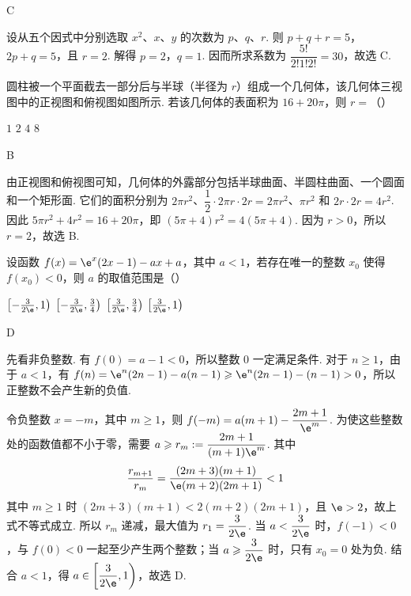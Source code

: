 \begin{answer}
C
\end{answer}

\begin{solution}
设从五个因式中分别选取 \(x^2\)、\(x\)、\(y\) 的次数为 \(p\)、\(q\)、\(r\). 则
\(p+q+r=5\)，\(2p+q=5\)，且 \(r=2\). 解得 \(p=2\)，\(q=1\). 因而所求系数为
\(\dfrac{5!}{2!1!2!}=30\)，故选 C.
\end{solution}

\begin{problem}
圆柱被一个平面截去一部分后与半球（半径为 \(r\)）组成一个几何体，该几何体三视图中的正视图和俯视图如图所示. 若该几何体的表面积为 \(16 + 20\pi\)，则 \(r=\)（\quad）


\choices
    {\(1\)}
    {\(2\)}
    {\(4\)}
    {\(8\)}
\end{problem}

\begin{answer}
B
\end{answer}

\begin{solution}
由正视图和俯视图可知，几何体的外露部分包括半球曲面、半圆柱曲面、一个圆面和一个矩形面. 它们的面积分别为 \(2\pi r^2\)、\(\dfrac12\cdot2\pi r\cdot2r=2\pi r^2\)、\(\pi r^2\) 和 \(2r\cdot2r=4r^2\). 因此
\(5\pi r^2+4r^2=16+20\pi\)，即 \((5\pi+4)r^2=4(5\pi+4)\). 因为 \(r>0\)，所以 \(r=2\)，故选 B.
\end{solution}

\begin{problem}
设函数 \( f(x) = \e^{x}(2x - 1) - ax + a \)，其中 \( a < 1 \)，若存在唯一的整数 \( x_0 \) 使得 \( f(x_0) < 0 \)，则 \( a \) 的取值范围是（\quad）

\choices
    {\( \left[-\frac{3}{2\e},1\right) \)}
    {\( \left[-\frac{3}{2\e},\frac{3}{4}\right) \)}
    {\( \left[\frac{3}{2\e},\frac{3}{4}\right) \)}
    {\( \left[\frac{3}{2\e},1\right) \)}
\end{problem}

\begin{answer}
D
\end{answer}

\begin{solution}
先看非负整数. 有 \(f(0)=a-1<0\)，所以整数 \(0\) 一定满足条件. 对于 \(n\geqslant1\)，由于 \(a<1\)，有
\(f(n)=\e^n(2n-1)-a(n-1)\geqslant\e^n(2n-1)-(n-1)>0\)，所以正整数不会产生新的负值.

令负整数 \(x=-m\)，其中 \(m\geqslant1\)，则
\(f(-m)=a(m+1)-\dfrac{2m+1}{\e^m}\). 为使这些整数处的函数值都不小于零，需要
\(a\geqslant r_m:=\dfrac{2m+1}{(m+1)\e^m}\). 其中
\[
\frac{r_{m+1}}{r_m}=\frac{(2m+3)(m+1)}{\e(m+2)(2m+1)}<1
\]
其中 \(m\geqslant1\) 时 \((2m+3)(m+1)<2(m+2)(2m+1)\)，且 \(\e>2\)，故上式不等式成立.
所以 \(r_m\) 递减，最大值为 \(r_1=\dfrac{3}{2\e}\). 当 \(a<\dfrac{3}{2\e}\) 时，\(f(-1)<0\)，与 \(f(0)<0\) 一起至少产生两个整数；当 \(a\geqslant\dfrac{3}{2\e}\) 时，只有 \(x_0=0\) 处为负. 结合 \(a<1\)，得 \(a\in\left[\dfrac{3}{2\e},1\right)\)，故选 D.
\end{solution}

